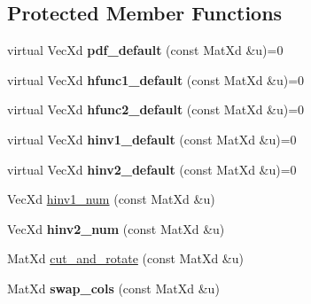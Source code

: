\subsection*{Protected Member Functions}
\begin{DoxyCompactItemize}
\item 
\hypertarget{class_bicop_a89e76fb74a9a4583cd74ce7bd72b5821}{virtual Vec\+Xd {\bfseries pdf\+\_\+default} (const Mat\+Xd \&u)=0}\label{class_bicop_a89e76fb74a9a4583cd74ce7bd72b5821}

\item 
\hypertarget{class_bicop_a60b997ec055f573034fc1736470ed7db}{virtual Vec\+Xd {\bfseries hfunc1\+\_\+default} (const Mat\+Xd \&u)=0}\label{class_bicop_a60b997ec055f573034fc1736470ed7db}

\item 
\hypertarget{class_bicop_afb7f326409f22b6b65e46f89dcf5ee1a}{virtual Vec\+Xd {\bfseries hfunc2\+\_\+default} (const Mat\+Xd \&u)=0}\label{class_bicop_afb7f326409f22b6b65e46f89dcf5ee1a}

\item 
\hypertarget{class_bicop_a401bdcb4172c55b3d5f0c2a0db30ca43}{virtual Vec\+Xd {\bfseries hinv1\+\_\+default} (const Mat\+Xd \&u)=0}\label{class_bicop_a401bdcb4172c55b3d5f0c2a0db30ca43}

\item 
\hypertarget{class_bicop_a046b0fdc43eed27002f0b7c3bc9a9ddb}{virtual Vec\+Xd {\bfseries hinv2\+\_\+default} (const Mat\+Xd \&u)=0}\label{class_bicop_a046b0fdc43eed27002f0b7c3bc9a9ddb}

\item 
Vec\+Xd \hyperlink{class_bicop_abd517becaa97834eac56b0d1a0c7a666}{hinv1\+\_\+num} (const Mat\+Xd \&u)
\item 
\hypertarget{class_bicop_a2b262e9e2adee0c215da47467f1dec45}{Vec\+Xd {\bfseries hinv2\+\_\+num} (const Mat\+Xd \&u)}\label{class_bicop_a2b262e9e2adee0c215da47467f1dec45}

\item 
Mat\+Xd \hyperlink{class_bicop_a48dc314b01b0c5b0adb307d27d4dd53e}{cut\+\_\+and\+\_\+rotate} (const Mat\+Xd \&u)
\item 
\hypertarget{class_bicop_a96e06c8996e378d56d9e87ff4d1a24ac}{Mat\+Xd {\bfseries swap\+\_\+cols} (const Mat\+Xd \&u)}\label{class_bicop_a96e06c8996e378d56d9e87ff4d1a24ac}

\end{DoxyCompactItemize}
